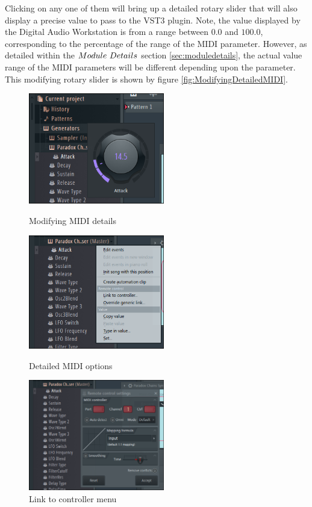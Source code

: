 \documentclass[a4paper,12pt]{report}
\begin{document}
Clicking on any one of them will bring up a detailed rotary slider that will also display a precise value to pass to the VST3 plugin. Note, the value displayed by the Digital Audio Workstation is from a range between $0.0$ and $100.0$, corresponding to the percentage of the range of the MIDI parameter. However, as detailed within the $Module\ \-Details$ section \ref{sec:moduledetails}, the actual value range of the MIDI parameters will be different depending upon the parameter. This modifying rotary slider is shown by figure \ref{fig:ModifyingDetailedMIDI}.

\begin{figure} \centering
\includegraphics[width=16em]{ModifyingDetailedMIDI.png}
    \caption{Modifying MIDI details}     \label{fig:ModifyingDetailedMIDI}
    \includegraphics[width=16em]{ExtraOptions01.png}
    \caption{Detailed MIDI options}     \label{fig:ExtraOptions01}
    \includegraphics[width=16em]{ExtraOptions02.png}
    \caption{Link to controller menu}     \label{fig:ExtraOptions02}
    \end{figure}
\end{document}
